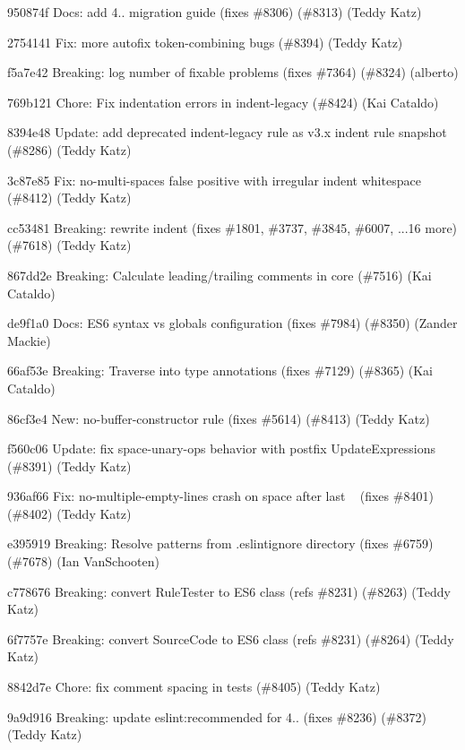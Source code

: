 \begin{DoxyItemize}
\item 950874f Docs\+: add 4.. migration guide (fixes \#8306) (\#8313) (Teddy Katz)
\item 2754141 Fix\+: more autofix token-\/combining bugs (\#8394) (Teddy Katz)
\item f5a7e42 Breaking\+: log number of fixable problems (fixes \#7364) (\#8324) (alberto)
\item 769b121 Chore\+: Fix indentation errors in indent-\/legacy (\#8424) (Kai Cataldo)
\item 8394e48 Update\+: add deprecated indent-\/legacy rule as v3.\+x indent rule snapshot (\#8286) (Teddy Katz)
\item 3c87e85 Fix\+: no-\/multi-\/spaces false positive with irregular indent whitespace (\#8412) (Teddy Katz)
\item cc53481 Breaking\+: rewrite indent (fixes \#1801, \#3737, \#3845, \#6007, ...16 more) (\#7618) (Teddy Katz)
\item 867dd2e Breaking\+: Calculate leading/trailing comments in core (\#7516) (Kai Cataldo)
\item de9f1a0 Docs\+: E\+S6 syntax vs globals configuration (fixes \#7984) (\#8350) (Zander Mackie)
\item 66af53e Breaking\+: Traverse into type annotations (fixes \#7129) (\#8365) (Kai Cataldo)
\item 86cf3e4 New\+: no-\/buffer-\/constructor rule (fixes \#5614) (\#8413) (Teddy Katz)
\item f560c06 Update\+: fix space-\/unary-\/ops behavior with postfix Update\+Expressions (\#8391) (Teddy Katz)
\item 936af66 Fix\+: no-\/multiple-\/empty-\/lines crash on space after last ~\newline
 (fixes \#8401) (\#8402) (Teddy Katz)
\item e395919 Breaking\+: Resolve patterns from .eslintignore directory (fixes \#6759) (\#7678) (Ian Van\+Schooten)
\item c778676 Breaking\+: convert Rule\+Tester to E\+S6 class (refs \#8231) (\#8263) (Teddy Katz)
\item 6f7757e Breaking\+: convert Source\+Code to E\+S6 class (refs \#8231) (\#8264) (Teddy Katz)
\item 8842d7e Chore\+: fix comment spacing in tests (\#8405) (Teddy Katz)
\item 9a9d916 Breaking\+: update eslint\+:recommended for 4.. (fixes \#8236) (\#8372) (Teddy Katz)

\end{DoxyItemize}
